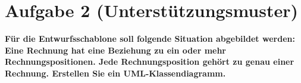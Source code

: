 \section{Aufgabe 2 (Unterstützungsmuster)}
\textbf{Für die Entwurfsschablone  soll folgende Situation
abgebildet werden: Eine Rechnung hat eine Beziehung zu ein oder mehr
Rechnungspositionen. Jede Rechnungsposition gehört zu genau einer Rechnung.
Erstellen Sie ein UML-Klassendiagramm.}


\clearpage

